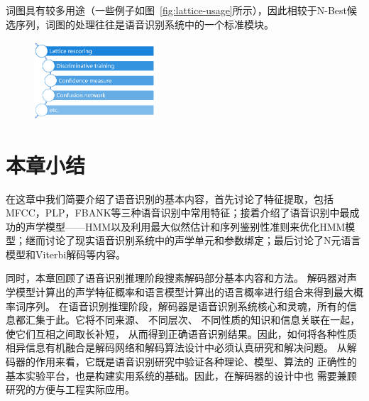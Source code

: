 词图具有较多用途（一些例子如图~\ref{fig:lattice-usage}所示），因此相较于N-Best候选序列，词图的处理往往是语音识别系统中的一个标准模块。

\begin{figure}[!htp]
  \centering
    \captionstyle{\centering}
    \includegraphics[clip=true, width=0.4\textwidth]{figure/lattice_usage.png}
\end{figure}


\section{本章小结}
\label{chap:intro-sum}

在这章中我们简要介绍了语音识别的基本内容，首先讨论了特征提取，包括MFCC，PLP，FBANK等三种语音识别中常用特征；接着介绍了语音识别中最成功的声学模型——HMM以及利用最大似然估计和序列鉴别性准则来优化HMM模型；继而讨论了现实语音识别系统中的声学单元和参数绑定；最后讨论了N元语言模型和Viterbi解码等内容。

同时，本章回顾了语音识别推理阶段搜素解码部分基本内容和方法。
解码器对声学模型计算出的声学特征概率和语言模型计算出的语言概率进行组合来得到最大概率词序列。
%
在语音识别推理阶段，解码器是语音识别系统核心和灵魂，所有的信息都汇集于此。它将不同来源、 不同层次、 不同性质的知识和信息关联在一起，使它们互相之间取长补短， 从而得到正确语音识别结果。因此，如何将各种性质相异信息有机融合是解码网络和解码算法设计中必须认真研究和解决问题。
从解码器的作用来看，它既是语音识别研究中验证各种理论、模型、算法的
正确性的基本实验平台，也是构建实用系统的基础。因此，在解码器的设计中也
需要兼顾研究的方便与工程实际应用。